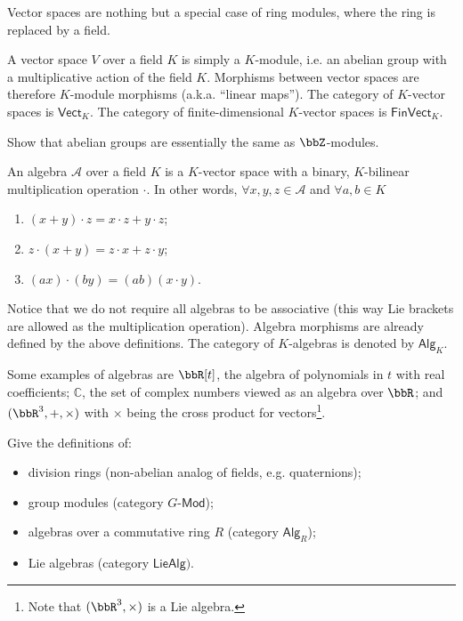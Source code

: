 Vector spaces are nothing but a special case of ring modules, where
the ring is replaced by a field.
\begin{defn}
A vector space $V$ over a field $K$ is simply a $K$-module, i.e.
an abelian group with a multiplicative action of the field $K$. Morphisms
between vector spaces are therefore $K$-module morphisms (a.k.a.
``linear maps''). The category of $K$-vector spaces is $\mathsf{Vect}_{K}$.
The category of finite-dimensional $K$-vector spaces is $\mathsf{FinVect}_{K}$.
\end{defn}
\begin{xca}
Show that abelian groups are essentially the same as $\bbZ$-modules.
\end{xca}
\begin{defn}
An algebra $\mathcal{A}$ over a field $K$ is a $K$-vector space
with a binary, $K$-bilinear multiplication operation $\cdot$. In
other words, $\forall x,y,z\in\mathcal{A}$ and $\forall a,b\in K$ 
\begin{enumerate}
\item $(x+y)\cdot z=x\cdot z+y\cdot z$;
\item $z\cdot(x+y)=z\cdot x+z\cdot y$;
\item $(ax)\cdot(by)=(ab)(x\cdot y)$.
\end{enumerate}
\end{defn}
Notice that we do not require all algebras to be associative (this
way Lie brackets are allowed as the multiplication operation). Algebra
morphisms are already defined by the above definitions. The category
of $K$-algebras is denoted by $\mathsf{Alg}_{K}$.
\begin{example}
Some examples of algebras are $\bbR [t]$, the algebra of polynomials
in $t$ with real coefficients; $\mathbb{C}$, the set of complex
numbers viewed as an algebra over $\bbR $; and $(\bbR^{3},+,\times)$
with $\times$ being the cross product for vectors\footnote{Note that $(\bbR^{3},\times)$ is a Lie algebra.}.
\end{example}
\begin{xca}
Give the definitions of:
\begin{itemize}
\item division rings (non-abelian analog of fields, e.g. quaternions);
\item group modules (category $G\text{-}\mathsf{Mod}$);
\item algebras over a commutative ring $R$ (category $\mathsf{Alg}_{R}$);
\item Lie algebras (category $\mathsf{LieAlg})$.
\end{itemize}
\end{xca}

